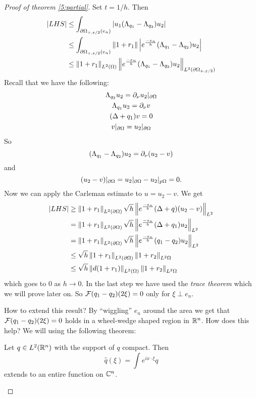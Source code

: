 \begin{proof}[Proof of theorem \ref{5:partial}]
  Set $t=1/h$.
  Then
  \begin{align*}
    \left\lvert LHS \right\rvert &\leq \int_{\partial\Omega_{+,\varepsilon/2}(e_n)} \left\lvert u_1(\Lambda_{q_1}-\Lambda_{q_2})u_2 \right\rvert \\
    &\leq \int_{\partial\Omega_{+,\varepsilon/2}(e_n)} \left\lVert 1+r_1 \right\rVert \left\lvert e^\frac{-x_n}h(\Lambda_{q_1}-\Lambda_{q_2})u_2 \right\rvert \\
    &\leq \left\lVert 1+r_1 \right\rVert_{L^2(\Omega)} \left\lVert e^\frac{-x_n}h(\Lambda_{q_1}-\Lambda_{q_2})u_2 \right\rVert_{L^2(\partial\Omega_{+,\varepsilon/2})} \\
  \end{align*}
  Recall that we have the following:
  \begin{gather*}
    \Lambda_{q_2}u_2 = \partial_\nu u_2|_{\partial\Omega} \\
    \Lambda_{q_1}u_2 = \partial_\nu v \\
    (\Delta+q_1)v=0 \\
    v|_{\partial\Omega} = u_2|_{\partial\Omega}
  \end{gather*}
  So
  \[ (\Lambda_{q_1}-\Lambda_{q_2})u_2 = \partial_\nu (u_2-v) \]
  and
  \[ (u_2-v)|_{\partial\Omega} = u_2|_{\partial\Omega} - u_2|_{p\Omega} = 0. \]
  Now we can apply the Carleman estimate to $u=u_2-v$.
  We get
  \begin{align*}
    \left\lvert LHS \right\rvert &\geq \left\lVert 1+r_1 \right\rVert_{L^2(\partial\Omega)} \sqrt{h} \left\lVert e^\frac{-x_n}h (\Delta+q)(u_2-v) \right\rVert_{L^2} \\
     &= \left\lVert 1+r_1 \right\rVert_{L^2(\partial\Omega)} \sqrt{h} \left\lVert e^\frac{-x_n}h (\Delta+q_1)u_2 \right\rVert_{L^2} \\
     &= \left\lVert 1+r_1 \right\rVert_{L^2(\partial\Omega)} \sqrt{h} \left\lVert e^\frac{-x_n}h (q_1-q_2)u_2 \right\rVert_{L^2} \\
     &\leq \sqrt{h} \left\lVert 1+r_1 \right\rVert_{L^2(\partial\Omega)}\left\lVert 1+r_2 \right\rVert_{L^2{\Omega}} \\
     &\leq \sqrt{h} \left\lVert d(1+r_1) \right\rVert_{L^2(\Omega)}\left\lVert 1+r_2 \right\rVert_{L^2{\Omega}}
  \end{align*}
  which goes to $0$ as $h \to 0$.
  In the last step we have used the \emph{trace theorem} which we will prove later on.
  So $\mathcal{F}(q_1-q_2)(2\xi)=0$ only for $\xi\perp e_n$.

  How to extend this result?
  By ``wiggling'' $e_n$ around the area we get that $\mathcal{F}(q_1-q_2)(2\xi)=0$ holds in a wheel-wedge shaped region in $\mathbb{R}^n$.
  How does this help?
  We will using the following theorem:

  \begin{thm}
    Let $q \in L^2(\mathbb{R}^n)$ with the support of $q$ compact.
    Then
    \[ \hat q(\xi) = \int e^{ix\cdot\xi} q \]
    extends to an entire function on $\mathbb{C}^n$.
  \end{thm}


\end{proof}
